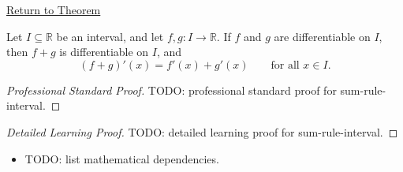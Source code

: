 \newpage
{}
\label{prf:sum-rule-interval}

\begin{remark*}[Return]
\hyperref[thm:sum-rule-interval]{Return to Theorem}
\end{remark*}

\begin{theorem*}
Let $I \subseteq \mathbb{R}$ be an interval, and let $f, g : I \to \mathbb{R}$. If $f$ and $g$ are differentiable on $I$, then $f + g$ is differentiable on $I$, and
\[
(f+g)'(x) = f'(x) + g'(x) \qquad \text{for all } x \in I.
\]
\end{theorem*}

\begin{proof}[Professional Standard Proof]
\LRAProofBodyStart
TODO: professional standard proof for sum-rule-interval.
\end{proof}

\begin{proof}[Detailed Learning Proof]
\LRAProofBodyStart
TODO: detailed learning proof for sum-rule-interval.
\end{proof}

\begin{remark*}
\end{remark*}

\begin{dependencies}
\begin{itemize}
  \item TODO: list mathematical dependencies.
\end{itemize}
\end{dependencies}

\clearpage
